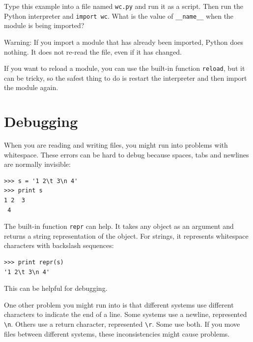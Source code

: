 \documentclass[10pt]{book}
\begin{document}
{\begin{ex}
Type this example into a file named {\tt wc.py} and run
it as a script.  Then run the Python interpreter and
{\tt import wc}.  What is the value of \verb"__name__"
when the module is being imported?

Warning: If you import a module that has already been imported,
Python does nothing.  It does not re-read the file, even if it has
changed.


If you want to reload a module, you can use the built-in function 
{\tt reload}, but it can be tricky, so the safest thing to do is
restart the interpreter and then import the module again.
\end{ex}



\section{Debugging}


When you are reading and writing files, you might run into problems
with whitespace.  These errors can be hard to debug because spaces,
tabs and newlines are normally invisible:

\beforeverb
\begin{verbatim}
>>> s = '1 2\t 3\n 4'
>>> print s
1 2	 3
 4
\end{verbatim}
\afterverb


The built-in function {\tt repr} can help.  It takes any object as an
argument and returns a string representation of the object.  For
strings, it represents whitespace
characters with backslash sequences:

\beforeverb
\begin{verbatim}
>>> print repr(s)
'1 2\t 3\n 4'
\end{verbatim}
\afterverb

This can be helpful for debugging.

One other problem you might run into is that different systems
use different characters to indicate the end of a line.  Some
systems use a newline, represented \verb"\n".  Others use
a return character, represented \verb"\r".  Some use both.
If you move files between different systems, these inconsistencies
might cause problems.

}
\end{document}
